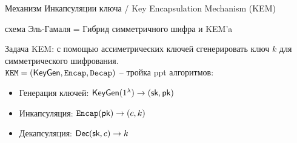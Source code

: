 \documentclass[usenames,dvipsnames,8pt,aspectratio=169]{beamer}
\begin{document}
\begin{frame}{Механизм Инкапсуляции ключа / Key Encapsulation Mechanism (KEM)}
	
	\Large
	
	\begin{center}
		
		{\color{Orange} схема Эль-Гамаля  = Гибрид симметричного шифра и KEM'a} \\[10pt]
	\end{center}
	
	Задача KEM: с помощью ассиметрических ключей сгенерировать ключ $k$ для симметрического шифрования.\\[10pt]
	
	$\mathtt{KEM} = (\textsf{KeyGen}, \mathtt{Encap}, \mathtt{Decap})$ -- тройка ppt алгоритмов: \\
	\begin{itemize}
		\itemsep 10pt
		\item Генерация ключей: $\textsf{KeyGen}(1^\lambda) \rightarrow (\textsf{sk}, \textsf{pk}) $
		\item Инкапсуляция: $\mathtt{Encap}(\textsf{pk} ) \rightarrow (c, k)$
		\item Декапсуляция:  $\textsf{Dec}(\textsf{sk}, c) \rightarrow k$
	\end{itemize}
	
\end{frame}
\end{document}
